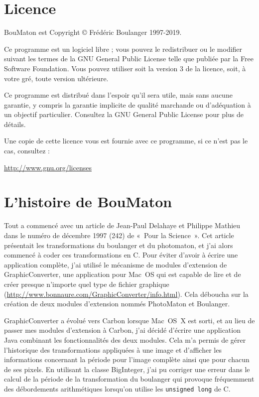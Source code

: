 \documentclass[a4paper]{article}
\newcommand{\BouMaton}{\textsf{BouMaton}\xspace}
\newcommand{\filename}[1]{\textsf{#1}}
\begin{document}
  \section{Licence}
  \newlength{\savedindent}
  \setlength{\savedindent}{\parindent}
  \setlength{\parindent}{0pt}
  \newlength{\savedskip}
  \setlength{\savedskip}{\parskip}
  \setlength{\parskip}{1ex}
  
  \BouMaton est Copyright © Frédéric Boulanger 1997-2019.
  
  Ce programme est un logiciel libre ; vous pouvez le redistribuer ou le modifier
  suivant les termes de la GNU General Public License telle que publiée par la
  Free Software Foundation. Vous pouvez utiliser soit la version 3 de la licence, 
  soit, à votre gré, toute version ultérieure.
  
  Ce programme est distribué dans l'espoir qu'il sera utile, mais sans aucune garantie, 
  y compris la garantie implicite de qualité marchande ou d'adéquation à un objectif
  particulier. Consultez la GNU General Public License pour plus de détails.
  
  Une copie de cette licence vous est fournie avec ce programme, si ce n'est pas le cas, 
  consultez :
  \begin{center}
  	\url{http://www.gnu.org/licenses}
  \end{center}
  
  \setlength{\parindent}{\savedindent}
  \setlength{\parskip}{\savedskip}
  
  \section{L'histoire de \BouMaton}
  Tout a commencé avec un article de Jean-Paul Delahaye et Philippe
  Mathieu dans le numéro de décembre 1997 (242) de «~Pour la
  Science~».  Cet article présentait les transformations du
  boulanger et du photomaton, et j'ai alors commencé à coder ces
  transformations en C. Pour éviter d'avoir à écrire une
  application complète, j'ai utilisé le mécanisme de modules
  d'extension de GraphicConverter, une application pour
  Mac~OS qui est capable de lire et de créer presque n'importe quel
  type de fichier graphique
  (\url{http://www.bonnaure.com/GraphicConverter/info.html}). Cela 
  déboucha sur la création de deux modules d'extension nommés 
  \filename{PhotoMaton} et \filename{Boulanger}.

  GraphicConverter a évolué vers Carbon lorsque Mac~OS~X est sorti, et 
  au lieu de passer mes modules d'extension à Carbon, j'ai décidé 
  d'écrire une application Java combinant les fonctionnalités des deux 
  modules. Cela m'a permis de gérer l'historique des transformations 
  appliquées à une image et d'afficher les informations concernant la 
  période pour l'image complète ainsi que pour chacun de ses pixels. 
  En utilisant la classe BigInteger, j'ai pu corriger une erreur dans 
  le calcul de la période de la transformation du boulanger qui 
  provoque fréquemment des débordements arithmétiques lorsqu'on utilise 
  les \verb|unsigned long| de C.
\end{document}
